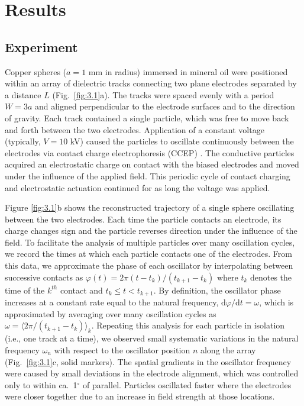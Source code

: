 \section{Results}

\subsection{Experiment}

Copper spheres ($a = 1$ mm in radius) immersed in mineral oil were positioned within an array of dielectric tracks connecting two plane electrodes separated by a distance $L$ (Fig.~\ref{fig:3.1}a). The tracks were spaced evenly with a period $W=3a$ and aligned perpendicular to the electrode surfaces and to the direction of gravity. Each track contained a single particle, which was free to move back and forth between the two electrodes. Application of a constant voltage (typically, $V=10$ kV) caused the particles to oscillate continuously between the electrodes via contact charge electrophoresis (CCEP) \autocite{bishop2018contact, drews2015contact}. The conductive particles acquired an electrostatic charge on contact with the biased electrodes and moved under the influence of the applied field. This periodic cycle of contact charging and electrostatic actuation continued for as long the voltage was applied.


Figure \ref{fig:3.1}b shows the reconstructed trajectory of a single sphere oscillating between the two electrodes. Each time the particle contacts an electrode, its charge changes sign and the particle reverses direction under the influence of the field. To facilitate the analysis of multiple particles over many oscillation cycles, we record the times at which each particle contacts one of the electrodes.  From this data, we approximate the phase of each oscillator by interpolating between successive contacts as $\varphi(t) = 2\pi (t-t_k)/ (t_{k+1}-t_{k})$ where $t_k$ denotes the time of the $k^{th}$ contact and $t_k \leq t < t_{k+1}$. By definition, the oscillator phase increases at a constant rate equal to the natural frequency, $\mathrm{d}\varphi/\mathrm{d}t = \omega$, which is approximated by averaging over many oscillation cycles as $\omega = \langle 2\pi/(t_{k+1}-t_{k}) \rangle_k$. Repeating this analysis for each particle in isolation (i.e., one track at a time), we observed small systematic variations in the natural frequency $\omega_n$ with respect to the oscillator position $n$ along the array (Fig.~\ref{fig:3.1}c, solid markers). The spatial gradients in the oscillator frequency were caused by small deviations in the electrode alignment,  which was controlled only to within ca.~1$^\circ$ of parallel. Particles oscillated faster where the electrodes were closer together due to an increase in field strength at those locations.
        
